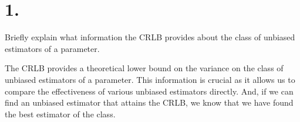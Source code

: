 \section*{1.}

Briefly explain what information the CRLB provides about the class of unbiased estimators of a parameter.

The CRLB provides a theoretical lower bound on the variance on the class of unbiased estimators of a parameter. This information is crucial as it allows us to compare the effectiveness of various unbiased estimators directly. And, if we can find an unbiased estimator that attains the CRLB, we know that we have found the best estimator of the class. 
